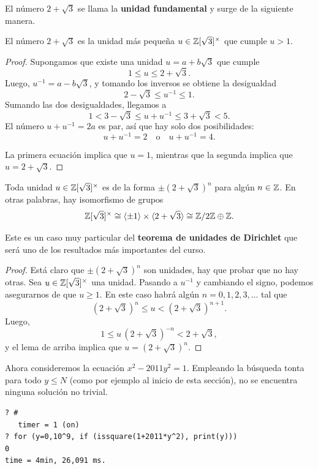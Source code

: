 El número $2 + \sqrt{3}$ se llama la \textbf{unidad fundamental} y surge de la
siguiente manera.

\begin{lema}
  El número $2 + \sqrt{3}$ es la unidad más pequeña
  $u \in \mathbb{Z} [\sqrt{3}]^\times$ que cumple $u > 1$.

  \begin{proof}
    Supongamos que existe una unidad $u = a + b\sqrt{3}$ que cumple
    $$1 \le u \le 2 + \sqrt{3}.$$
    Luego, $u^{-1} = a - b\sqrt{3}$, y tomando los inversos se obtiene la
    desigualdad
    $$2 - \sqrt{3} \le u^{-1} \le 1.$$
    Sumando las dos desigualdades, llegamos a
    $$1 < 3 - \sqrt{3} \le u + u^{-1} \le 3 + \sqrt{3} < 5.$$
    El número $u + u^{-1} = 2a$ es par, así que hay solo dos posibilidades:
    $$u + u^{-1} = 2 \quad\text{o}\quad u + u^{-1} = 4.$$

    La primera ecuación implica que $u = 1$, mientras que la segunda implica que
    $u = 2 + \sqrt{3}$.
\end{proof}
\end{lema}

\begin{teorema}
  Toda unidad $u \in \mathbb{Z} [\sqrt{3}]^\times$ es de la forma $\pm (2 +
  \sqrt{3})^n$ para algún $n \in \mathbb{Z}$. En otras palabras, hay isomorfismo de
  grupos
  \[ \mathbb{Z} [\sqrt{3}]^\times
       \cong \langle \pm 1\rangle \times \langle 2 + \sqrt{3}\rangle
       \cong \mathbb{Z}/2\mathbb{Z} \oplus \mathbb{Z}. \]
\end{teorema}

Este es un caso muy particular del \textbf{teorema de unidades de Dirichlet} que
será uno de los resultados más importantes del curso.

\begin{proof}
  Está claro que $\pm (2 + \sqrt{3})^n$ son unidades, hay que probar que no hay
  otras. Sea $u \in \mathbb{Z} [\sqrt{3}]^\times$ una unidad. Pasando a $u^{-1}$ y
  cambiando el signo, podemos asegurarnos de que $u \ge 1$. En este caso habrá
  algún $n = 0,1,2,3,\ldots$ tal que
  $$(2 + \sqrt{3})^n \le u < (2 + \sqrt{3})^{n+1}.$$
  Luego,
  $$1 \le u\,(2 + \sqrt{3})^{-n} < 2 + \sqrt{3},$$
  y el lema de arriba implica que $u = (2 + \sqrt{3})^n$.
\end{proof}

Ahora consideremos la ecuación $x^2 - 2011 y^2 = 1$. Empleando la búsqueda tonta
para todo $y \le N$ (como por ejemplo al inicio de esta sección), no se
encuentra ninguna solución no trivial.

\begin{shaded}
\begin{verbatim}
? #
   timer = 1 (on)
? for (y=0,10^9, if (issquare(1+2011*y^2), print(y)))
0
time = 4min, 26,091 ms.
\end{verbatim}
\end{shaded}

